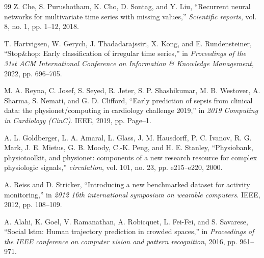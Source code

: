 \documentclass[twocolumn]{article}
\begin{document}
\begin{thebibliography}{99}
 Z. Che, S. Purushotham, K. Cho, D. Sontag, and Y. Liu, ``Recurrent neural networks for multivariate time series with missing values,'' \textit{Scientific reports}, vol. 8, no. 1, pp. 1--12, 2018.

 T. Hartvigsen, W. Gerych, J. Thadadarajssiri, X. Kong, and E. Rundensteiner, ``Stop\&hop: Early classification of irregular time series,'' in \textit{Proceedings of the 31st ACM International Conference on Information \& Knowledge Management}, 2022, pp. 696--705.

 M. A. Reyna, C. Josef, S. Seyed, R. Jeter, S. P. Shashikumar, M. B. Westover, A. Sharma, S. Nemati, and G. D. Clifford, ``Early prediction of sepsis from clinical data: the physionet/computing in cardiology challenge 2019,'' in \textit{2019 Computing in Cardiology (CinC)}. IEEE, 2019, pp. Page--1.

 A. L. Goldberger, L. A. Amaral, L. Glass, J. M. Hausdorff, P. C. Ivanov, R. G. Mark, J. E. Mietus, G. B. Moody, C.-K. Peng, and H. E. Stanley, ``Physiobank, physiotoolkit, and physionet: components of a new research resource for complex physiologic signals,'' \textit{circulation}, vol. 101, no. 23, pp. e215--e220, 2000.

 A. Reiss and D. Stricker, ``Introducing a new benchmarked dataset for activity monitoring,'' in \textit{2012 16th international symposium on wearable computers}. IEEE, 2012, pp. 108--109.

 A. Alahi, K. Goel, V. Ramanathan, A. Robicquet, L. Fei-Fei, and S. Savarese, ``Social lstm: Human trajectory prediction in crowded spaces,'' in \textit{Proceedings of the IEEE conference on computer vision and pattern recognition}, 2016, pp. 961--971.

\end{thebibliography}
\end{document}

